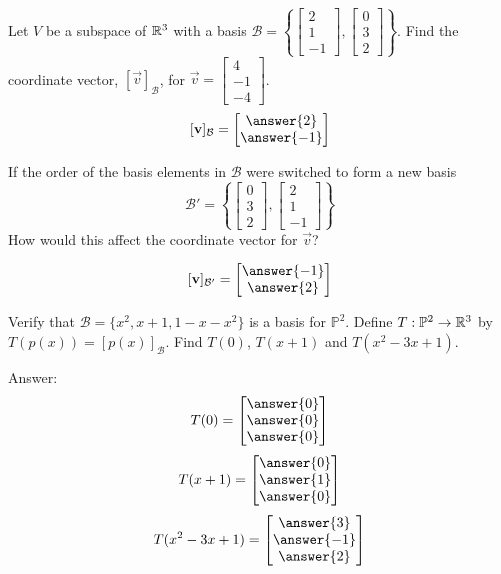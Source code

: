 \documentclass{ximera}
\begin{document}
\begin{problem}\label{prob:coordvector}
Let $V$ be a subspace of $\mathbb{R}^3$ with a basis $\mathcal{B}=\left\{\begin{bmatrix}2\\1\\-1\end{bmatrix}, \begin{bmatrix}0\\3\\2\end{bmatrix}\right\}$.  Find the coordinate vector, $[\vec{v}]_{\mathcal{B}}$, for $\vec{v}=\begin{bmatrix}4\\-1\\-4\end{bmatrix}$.
$$[\vec{v}]_{\mathcal{B}}=\begin{bmatrix}\answer{2}\\\answer{-1}\end{bmatrix}$$

If the order of the basis elements in $\mathcal{B}$ were switched to form a new basis
$$\mathcal{B}'=\left\{\begin{bmatrix}0\\3\\2\end{bmatrix}, \begin{bmatrix}2\\1\\-1\end{bmatrix} \right\}$$
How would this affect the coordinate vector for $\vec{v}$?

$$[\vec{v}]_{\mathcal{B}'}=\begin{bmatrix}\answer{-1}\\\answer{2}\end{bmatrix}$$
\end{problem}



\begin{problem}\label{prob:polylintranscoordvect} Verify that
$\mathcal{B}=\{x^{2}, x + 1, 1 - x - x^{2}\}$ is a basis for $\mathbb{P}^2$.  Define $T:\mathbb{P}^2\rightarrow \mathbb{R}^3$ by $T(p(x))=[p(x)]_{\mathcal{B}}$.  Find $T(0)$, $T(x+1)$ and $T(x^2-3x+1)$.

Answer:
$$T(0)=\begin{bmatrix}\answer{0}\\\answer{0}\\\answer{0}\end{bmatrix}$$
$$T(x+1)=\begin{bmatrix}\answer{0}\\\answer{1}\\\answer{0}\end{bmatrix}$$
$$T(x^2-3x+1)=\begin{bmatrix}\answer{3}\\\answer{-1}\\\answer{2}\end{bmatrix}$$
\end{problem}
\end{document}
